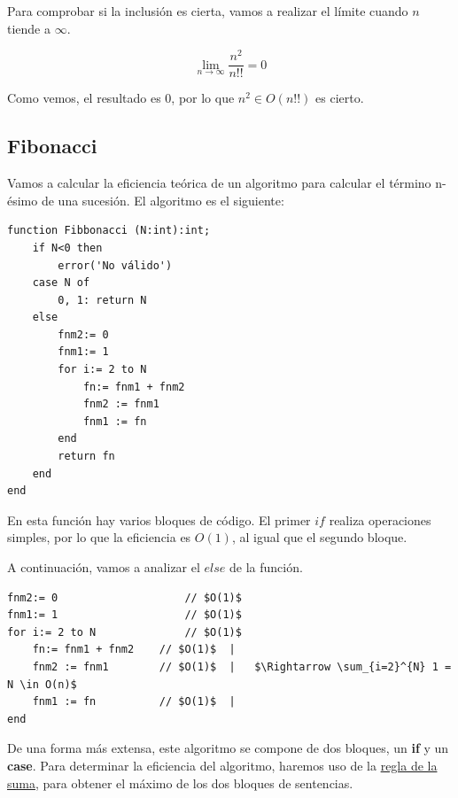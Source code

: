 \documentclass[10pt,a4paper,spanish]{report}
\theoremstyle{definition}
\theoremstyle{remark}
\begin{document}
\begin{multicols}{2}
Para comprobar si la inclusión es cierta, vamos a realizar el límite cuando $n$ tiende a $\infty$.

\begin{displaymath}
  \lim_{n \rightarrow \infty} \frac{n^2}{n!!} = 0
\end{displaymath}

Como vemos, el resultado es 0, por lo que $n^2 \in O(n!!)$ es cierto.

\end{multicols} 

\subsection{\textcolor[rgb]{0.1,0.2,1}Fibonacci}

Vamos a calcular la eficiencia teórica de un algoritmo para calcular el término n-ésimo de una sucesión. El algoritmo es el siguiente:

\begin{verbatim}
function Fibbonacci (N:int):int;
    if N<0 then
        error('No válido')
    case N of
        0, 1: return N
    else
        fnm2:= 0
        fnm1:= 1
        for i:= 2 to N
            fn:= fnm1 + fnm2
            fnm2 := fnm1
            fnm1 := fn
        end
        return fn
    end
end
\end{verbatim}

En esta función hay varios bloques de código. El primer $if$ realiza operaciones simples, por lo que la eficiencia es $O(1)$, al igual que el segundo bloque.

A continuación, vamos a analizar el $else$ de la función.

\begin{verbatim}
fnm2:= 0                    // $O(1)$
fnm1:= 1                    // $O(1)$
for i:= 2 to N              // $O(1)$
    fn:= fnm1 + fnm2    // $O(1)$  |
    fnm2 := fnm1        // $O(1)$  |   $\Rightarrow \sum_{i=2}^{N} 1 = N \in O(n)$
    fnm1 := fn          // $O(1)$  |
end
\end{verbatim}

De una forma más extensa, este algoritmo se compone de dos bloques, un \textbf{\textcolor[rgb]{0.1,0.2,1}{if}} y un \textbf{\textcolor[rgb]{0.1,0.2,1}{case}}. Para determinar la eficiencia del algoritmo, haremos uso de la \hyperref[reglas_efic]{regla de la suma}, para obtener el máximo de los dos bloques de sentencias.
\end{document}
